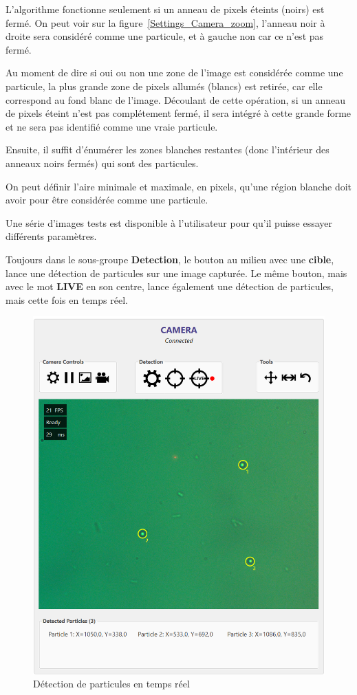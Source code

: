 L'algorithme fonctionne seulement si un anneau de pixels éteints (noirs) est fermé. On peut voir sur la figure~\ref{Settings_Camera_zoom}, l'anneau noir à droite sera considéré comme une particule, et à gauche non car ce n'est pas fermé.

Au moment de dire si oui ou non une zone de l'image est considérée comme une particule, la plus grande zone de pixels allumés (blancs) est retirée, car elle correspond au fond blanc de l'image. Découlant de cette opération, si un anneau de pixels éteint n'est pas complétement fermé, il sera intégré à cette grande forme et ne sera pas identifié comme une vraie particule.

Ensuite, il suffit d'énumérer les zones blanches restantes (donc l'intérieur des anneaux noirs fermés) qui sont des particules.

On peut définir l'aire minimale et maximale, en pixels, qu'une région blanche doit avoir pour être considérée comme une particule.

Une série d'images tests est disponible à l'utilisateur pour qu'il puisse essayer différents paramètres.

Toujours dans le sous-groupe \textbf{Detection}, le bouton au milieu avec une \textbf{cible}, lance une détection de particules sur une image capturée. Le même bouton, mais avec le mot \textbf{LIVE} en son centre, lance également une détection de particules, mais cette fois en temps réel.
\newpage
\begin{figure}[H]
    \centering
    \includegraphics[width=\textwidth]{assets/figures/Application_ServoVision/Live_Targeting_Bead.png}
    \caption{Détection de particules en temps réel}
    \label{Live_Targeting_Bead}
\end{figure}

